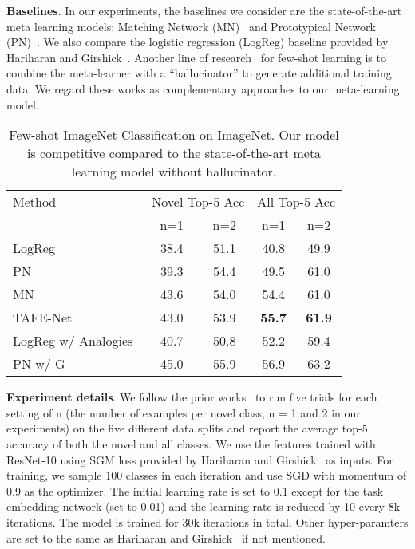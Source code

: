 \documentclass[10pt,twocolumn,letterpaper]{article}
\newcommand{\model}{TAFE-Net\xspace}
\newcommand\minisection[1]{\vspace{2mm}\noindent \textbf{#1}}
\begin{document}
\minisection{Baselines}. In our experiments, the  baselines we consider are the 
state-of-the-art meta learning models: Matching Network (MN)~\cite{vinyals2016matching}
and Prototypical Network (PN)~\cite{snell2017prototypical}. We also compare the logistic regression (LogReg) baseline provided by Hariharan and Girshick~\cite{hariharan2017low}. Another line of research~\cite{wang2018low, hariharan2017low} for few-shot learning is to combine
the meta-learner with a ``hallucinator'' to generate additional training data. We
regard these works as complementary approaches to our meta-learning model. 

\begin{table}[t]
	\centering
	\small
	\caption{Few-shot ImageNet Classification on ImageNet. Our model
		is competitive compared to the state-of-the-art meta learning model
		without hallucinator.}
	\label{tab:few-shot}
	\begin{tabular}{@{}l|cc|cc@{}}
Method & \multicolumn{2}{c}{Novel Top-5 Acc} & \multicolumn{2}{|c}{All Top-5 Acc} \\
		& n=1 & n=2  & n=1 & n=2  \\ 
		\midrule
		LogReg ~\cite{hariharan2017low} & 38.4 & 51.1  & 40.8 & 49.9 \\
		PN~\cite{snell2017prototypical} & 39.3 & 54.4  &  49.5 & 61.0 \\
		MN~\cite{vinyals2016matching} &  43.6 & 54.0  &  54.4 & 61.0  \\
		\midrule
		\model & 43.0 & 53.9 & \textbf{55.7} & \textbf{61.9} \\
		\midrule\midrule
		LogReg w/ Analogies~\cite{hariharan2017low} & 40.7 & 50.8 & 52.2 & 59.4 \\
		PN w/ G ~\cite{wang2018low} & 45.0 & 55.9 & 56.9 & 63.2 \\ 
\bottomrule
	\end{tabular}\vspace{-1em}
\end{table}

\minisection{Experiment details}. We follow the prior works~\cite{hariharan2017low, wang2018low} to run five trials for each setting of n (the number of examples per
novel class, n = 1 and 2 in our experiments) on the five different data splits and report the average top-5 accuracy of both
the novel and all classes. We use the features trained with ResNet-10 using SGM
loss provided by Hariharan and Girshick~\cite{hariharan2017low} as inputs. 
For training, we sample 100
classes in each iteration and use SGD with momentum of 0.9 as the optimizer. The
initial learning rate is set to 0.1 except for the task embedding network (set to
0.01) and the learning rate is reduced by 10 every 8k iterations.
The model is trained for 
30k iterations in total. Other hyper-paramters are set to the same as Hariharan and Girshick~\cite{hariharan2017low} if not mentioned.
\end{document}
